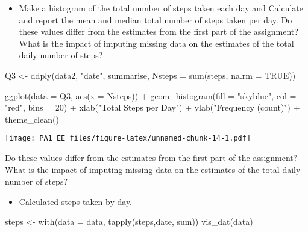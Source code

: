 \documentclass[
]{article}
\newenvironment{Shaded}{\begin{snugshade}}{\end{snugshade}}
\newcommand{\AttributeTok}[1]{\textcolor[rgb]{0.77,0.63,0.00}{#1}}
\newcommand{\ConstantTok}[1]{\textcolor[rgb]{0.00,0.00,0.00}{#1}}
\newcommand{\DecValTok}[1]{\textcolor[rgb]{0.00,0.00,0.81}{#1}}
\newcommand{\FunctionTok}[1]{\textcolor[rgb]{0.00,0.00,0.00}{#1}}
\newcommand{\NormalTok}[1]{#1}
\newcommand{\OtherTok}[1]{\textcolor[rgb]{0.56,0.35,0.01}{#1}}
\newcommand{\SpecialCharTok}[1]{\textcolor[rgb]{0.00,0.00,0.00}{#1}}
\newcommand{\StringTok}[1]{\textcolor[rgb]{0.31,0.60,0.02}{#1}}
\providecommand{\tightlist}{%
  \setlength{\itemsep}{0pt}\setlength{\parskip}{0pt}}
\begin{document}
\begin{itemize}
\tightlist
\item
  Make a histogram of the total number of steps taken each day and
  Calculate and report the mean and median total number of steps taken
  per day. Do these values differ from the estimates from the first part
  of the assignment? What is the impact of imputing missing data on the
  estimates of the total daily number of steps?
\end{itemize}

\begin{Shaded}
\begin{Highlighting}[]
\NormalTok{Q3 }\OtherTok{\textless{}{-}} \FunctionTok{ddply}\NormalTok{(data2, }\StringTok{"date"}\NormalTok{, summarise, }\AttributeTok{Nsteps =} \FunctionTok{sum}\NormalTok{(steps, }\AttributeTok{na.rm =} \ConstantTok{TRUE}\NormalTok{))}

\FunctionTok{ggplot}\NormalTok{(}\AttributeTok{data =}\NormalTok{ Q3, }\FunctionTok{aes}\NormalTok{(}\AttributeTok{x =}\NormalTok{ Nsteps)) }\SpecialCharTok{+}
  \FunctionTok{geom\_histogram}\NormalTok{(}\AttributeTok{fill =} \StringTok{"skyblue"}\NormalTok{, }\AttributeTok{col =} \StringTok{"red"}\NormalTok{, }\AttributeTok{bins =} \DecValTok{20}\NormalTok{) }\SpecialCharTok{+}
  \FunctionTok{xlab}\NormalTok{(}\StringTok{"Total Steps per Day"}\NormalTok{) }\SpecialCharTok{+}
  \FunctionTok{ylab}\NormalTok{(}\StringTok{"Frequency (count)"}\NormalTok{) }\SpecialCharTok{+}
  \FunctionTok{theme\_clean}\NormalTok{()}
\end{Highlighting}
\end{Shaded}

\texttt{[image: PA1\_EE\_files/figure-latex/unnamed-chunk-14-1.pdf]}

Do these values differ from the estimates from the first part of the
assignment? What is the impact of imputing missing data on the estimates
of the total daily number of steps?

\begin{itemize}
\tightlist
\item
  Calculated steps taken by day.
\end{itemize}

\begin{Shaded}
\begin{Highlighting}[]
\NormalTok{steps }\OtherTok{\textless{}{-}} \FunctionTok{with}\NormalTok{(}\AttributeTok{data =}\NormalTok{ data, }\FunctionTok{tapply}\NormalTok{(steps,date, sum))}
\FunctionTok{vis\_dat}\NormalTok{(data)}
\end{Highlighting}
\end{Shaded}
\end{document}
